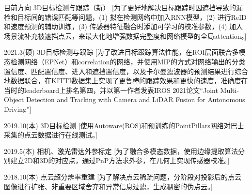 \documentclass[zh]{resume}
\begin{document}
\begin{experiences}

  \experience%
    {目前方向}%
    {3D目标检测与跟踪（新）}%
    [为了更好地解决目标跟踪时因遮挡导致的漏检和目标间的错误匹配等问题，(1) 拟在检测网络中加入RNN模型，(2) 进行ReID和速度预测的辅助训练，(3) 传感器特征融合时添加可学习的校准参数，(4) 加入场景流补充被遮挡点云，来最大化地增强数据完整度和网络模型的全局attention。] 
    
\separator{0.5ex}
  \experience%
    {2021.3(硕)}%
    {3D目标检测与跟踪}%
    [为了改进目标跟踪算法性能，在ROI层面联合多模态检测网络（EPNet）和correlation的网络，并使用MIP的方式对网络输出的分类置信度、匹配置信度、进入和遮挡置信度，以及卡尔曼滤波器的预测结果进行综合地数据联合，在KITTI数据集上实现了更鲁棒的跟踪效果和更快的速度，准确度在当时的leaderboard上排名第四，并以第一作者发表IROS 2021论文``Joint Multi-Object Detection and Tracking with Camera and LiDAR Fusion for Autonomous Driving'']

\separator{0.5ex}
  \experience%
    {2019.10(本)}%
    {3D目标检测}%
    [使用Autoware(ROS)和预训练的PointPillars网络对巴士采集的点云数据进行在线测试。] 

\separator{0.5ex}
  \experience%
    {2019.5(本)}%
    {相机、激光雷达外参标定}%
    [为了融合多模态数据，使用边缘提取算法分别建立2D和3D的对应点，通过PnP方法求外参，在几何上实现传感器校准。]

\separator{0.5ex}
  \experience%
    {2018.10(本)}%
    {点云超分辨率重建}%
    [为了解决点云稀疏问题，分阶段对投影后的点云图像进行扩张、非重要区域舍弃和异常信息过滤，生成稠密的伪点云。]   
\end{experiences}

\begin{competences}[12em]
\end{competences}
\end{document}
